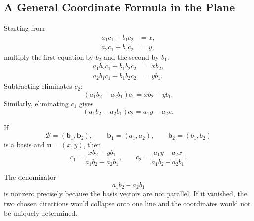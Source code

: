 \subsection{A General Coordinate Formula in the Plane}

\begin{derivationbox}
Starting from
\[
\begin{aligned}
 a_1c_1+b_1c_2&=x,\\
 a_2c_1+b_2c_2&=y,
\end{aligned}
\]
multiply the first equation by $b_2$ and the second by $b_1$:
\[
\begin{aligned}
 a_1b_2c_1+b_1b_2c_2&=xb_2,\\
 a_2b_1c_1+b_1b_2c_2&=yb_1.
\end{aligned}
\]
Subtracting eliminates $c_2$:
\[
(a_1b_2-a_2b_1)c_1=xb_2-yb_1.
\]
Similarly, eliminating $c_1$ gives
\[
(a_1b_2-a_2b_1)c_2=a_1y-a_2x.
\]
\end{derivationbox}

\begin{theorembox}
If
\[
\mathcal B=(\mathbf b_1,\mathbf b_2),
\qquad
\mathbf b_1=(a_1,a_2),
\qquad
\mathbf b_2=(b_1,b_2)
\]
is a basis and $\mathbf u=(x,y)$, then
\[
\boxed{
 c_1=\frac{xb_2-yb_1}{a_1b_2-a_2b_1},
 \qquad
 c_2=\frac{a_1y-a_2x}{a_1b_2-a_2b_1}
}.
\]
\end{theorembox}

\begin{interpretationbox}
The denominator
\[
a_1b_2-a_2b_1
\]
is nonzero precisely because the basis vectors are not parallel. If it vanished,
the two chosen directions would collapse onto one line and the coordinates would
not be uniquely determined.
\end{interpretationbox}
